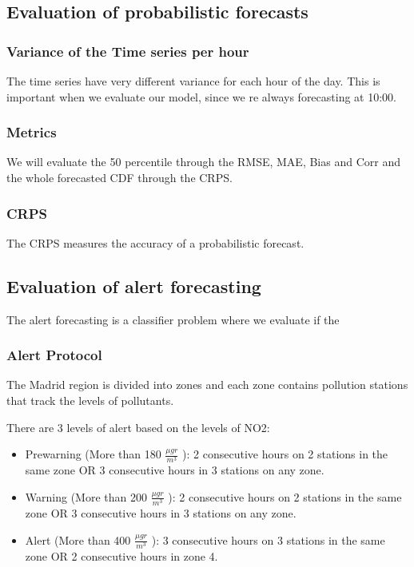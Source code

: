 \documentclass[a4paper,twocolumn,5p]{elsarticle}
\begin{document}
\subsection{Evaluation of probabilistic forecasts}

\subsubsection{Variance of the Time series per hour}

The time series have very different variance for each hour of the day. This is important when we evaluate our model, since
we re always forecasting at 10:00.

\subsubsection{Metrics}

We will evaluate the 50 percentile through the RMSE, MAE, Bias and Corr and the whole forecasted CDF through the CRPS.

\subsubsection{CRPS}
\label{sec:eval-extr-value}

The CRPS measures the accuracy of a probabilistic forecast. 

\subsection{Evaluation of alert forecasting}
\label{sec:eval-extr-value}

The alert forecasting is a classifier problem where we evaluate if the 

\subsubsection{Alert Protocol}

The Madrid region is divided into zones and each zone contains pollution stations that track the levels
of pollutants.

There are 3 levels of alert based on the levels of NO2:
\begin{itemize}
  \item Prewarning (More than 180 $\frac{\mu gr}{m^3}$ ): 2 consecutive hours on 2 stations in the same zone OR 3 
  consecutive hours in 3 stations on any zone.
  \item Warning (More than 200 $\frac{\mu gr}{m^3}$ ): 2 consecutive hours on 2 stations in the same zone OR 3 
  consecutive hours in 3 stations on any zone.
  \item Alert (More than 400 $\frac{\mu gr}{m^3}$ ): 3 consecutive hours on 3 stations in the same zone OR 2 
  consecutive hours in zone 4. 
\end{itemize} 
\end{document}
